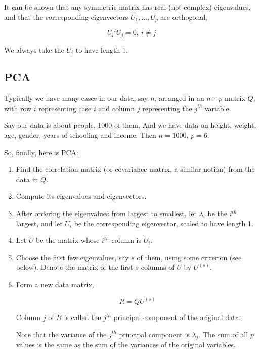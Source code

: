 It can be shown that any symmetric matrix has real (not complex)
eigenvalues, and that the corresponding eigenvectors $U_1,...,U_p$
are orthogonal,

\begin{equation}
U_i' U_j = 0, ~ i \neq j
\end{equation}

We always take the $U_i$ to have length 1.

\subsection{PCA}

Typically we have many cases in our data, say $n$, arranged in an $n
\times p$ matrix $Q$, with row $i$ representing case $i$ and column $j$
representing the $j^{th}$ variable.

Say our data is about people, 1000 of them,  And we have data on height,
weight, age, gender, years of schooling and income.  Then $n = 1000$, $p
= 6$.

So, finally, here is PCA:

\begin{enumerate}


\item Find the correlation matrix (or covariance matrix, a similar notion)
from the data in $Q$.  

\item Compute its eigenvalues and eigenvectors.  

\item After ordering the eigenvalues from largest to smallest, let
$\lambda_i$ be the $i^{th}$ largest, and let $U_i$ be the corresponding
eigenvector, scaled to have length 1.  

\item Let $U$ be the matrix whose $i^{th}$ column is $U_i$.  

\item Choose the first few eigenvalues, say $s$ of them, using some
criterion (see below).  Denote the matrix of the first $s$ columns of $U$
by $U^{(s)}$.

\item Form a new data matrix, 

\begin{equation}
R = Q U^{(s)}
\end{equation}

Column $j$ of $R$ is called the $j^{th}$ principal component of the
original data.

Note that the variance of the $j^{th}$ principal component is
$\lambda_j$.  The sum of all $p$ values is the same as the sum of the
variances of the original variables.

\end{enumerate} 

